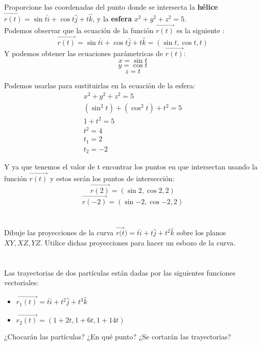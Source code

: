 \documentclass[12pt]{article}
\begin{document}
\section{}
Proporcione las coordenadas del punto donde se intersecta la \textbf{hélice} $\vec{r(t)}=\sin{t}\hat{i}+\cos{t}\hat{j}+t\hat{k}$, y la \textbf{esfera} $x^2+y^2+z^2=5$.\\
Podemos observar que la ecuación de la función $\vec{r(t)}$ es la siguiente :
\[
\vec{r(t)}=\sin{t}\hat{i}+\cos{t}\hat{j}+t\hat{k} = (\sin{t},\cos{t}, t )\]
Y podemos obtener las ecuaciones parámetricas de $\vec{r(t)}$:
\[ x =  \sin{t} \]
\[ y =  \cos{t} \]
\[ z =  t \]

Podemos usarlas para sustituirlas en la ecuación de la esfera:
 \begin{align*}
   x^2+y^2+z^2=5 \\
   (\sin^2{t}) + (\cos^2{t}) + t ^2 = 5 \\
   1+ t ^2 = 5 \\
   t ^2 = 4 \\
   t_1 = 2 \\
   t_2 = -2
 \end{align*}

 Y ya que tenemos el valor de t encontrar los puntos en que intersectan usando la función $\vec{r(t)}$ y estos serán los puntos de intersección:
\[
\vec{r(2)} = (\sin{2},\cos{2}, 2 )
\]
\[
\vec{r(-2)}= (\sin{-2},\cos{-2}, 2 )
\]
\section{}
Dibuje las proyecciones de la curva $\vec{r(t})=t\hat{i}+t\hat{j}+t^2\hat{k}$ sobre los planos $XY , XZ, YZ$. Utilice dichas proyecciones para hacer un esbozo de la curva.

\section{}
Las trayectorias de dos partículas están dadas por las siguientes funciones vectoriales:
\begin{itemize}[format=\textbf]

\item $\vec{r_1(t)}=t\hat{i}+t^2\hat{j}+t^3\hat{k}$

\item $\vec{r_2(t)}=(1+2t,1+6t,1+14t)$

\end{itemize}
¿Chocarán las partículas? ¿En qué punto? ¿Se cortarán las trayectorias?
\end{document}
